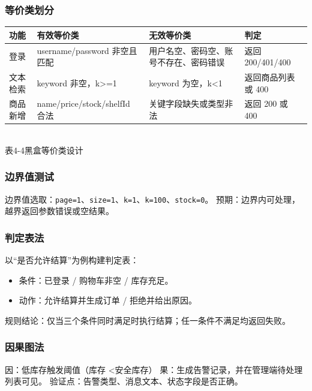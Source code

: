 \subsubsection{等价类划分}
\begin{center}
  \renewcommand{\arraystretch}{1.35}
  \begin{tabular}{|>{\centering\arraybackslash}m{2.2cm}|>{\centering\arraybackslash}m{3.2cm}|>{\centering\arraybackslash}m{4.6cm}|>{\centering\arraybackslash}m{3.2cm}|}
    \hline
    \textbf{功能} & \textbf{有效等价类} & \textbf{无效等价类} & \textbf{判定} \\ \hline
    登录 & username/password 非空且匹配 & 用户名空、密码空、账号不存在、密码错误 & 返回 200/401/400 \\ \hline
    文本检索 & keyword 非空，k\textgreater=1 & keyword 为空，k\textless1 & 返回商品列表或 400 \\ \hline
    商品新增 & name/price/stock/shelfId 合法 & 关键字段缺失或类型非法 & 返回 200 或 400 \\ \hline
  \end{tabular}
  \\[0.3em]
  {表4-4\quad 黑盒等价类设计}
\end{center}

\subsubsection{边界值测试}
边界值选取：\texttt{page=1}、\texttt{size=1}、\texttt{k=1}、\texttt{k=100}、\texttt{stock=0}。  
预期：边界内可处理，越界返回参数错误或空结果。

\subsubsection{判定表法}
以“是否允许结算”为例构建判定表：
\begin{itemize}[leftmargin=2em]
  \item 条件：已登录 / 购物车非空 / 库存充足。
  \item 动作：允许结算并生成订单 / 拒绝并给出原因。
\end{itemize}

规则结论：仅当三个条件同时满足时执行结算；任一条件不满足均返回失败。

\subsubsection{因果图法}
因：低库存触发阈值（库存 \textless 安全库存）  
果：生成告警记录，并在管理端待处理列表可见。  
验证点：告警类型、消息文本、状态字段是否正确。

